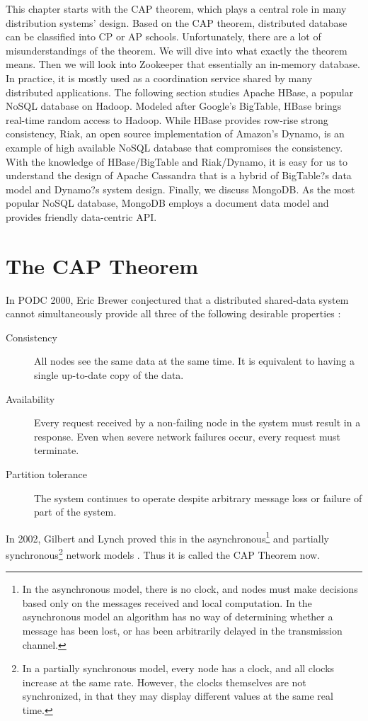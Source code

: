 \documentclass[12pt]{book}
\begin{document}
This chapter starts with the CAP theorem, which plays a central role in many distribution systems' design. Based on the CAP theorem, distributed database can be classified into CP or AP schools. Unfortunately, there are a lot of misunderstandings of the theorem. We will dive into what exactly the theorem means. Then we will look into Zookeeper that essentially an in-memory database. In practice, it is mostly used as a coordination service shared by many distributed applications. The following section studies Apache HBase, a popular NoSQL database on Hadoop. Modeled after Google's BigTable, HBase brings real-time random access to Hadoop. While HBase provides row-rise strong consistency, Riak, an open source implementation of Amazon's Dynamo, is an example of high available NoSQL database that compromises the consistency. With the knowledge of HBase/BigTable and Riak/Dynamo, it is easy for us to understand the design of Apache Cassandra that is a hybrid of BigTable?s data model and Dynamo?s system design. Finally, we discuss MongoDB. As the most popular NoSQL database, MongoDB employs a document data model and provides friendly data-centric API.

\section[The CAP Theorem]
{The CAP Theorem} \label{sec:cap}
In PODC 2000, Eric Brewer conjectured that a distributed shared-data system cannot simultaneously provide all three of the following desirable properties \cite{Brewer:2000:TRD}:
\begin{description}
\item[Consistency] All nodes see the same data at the same time. It is equivalent to having a single up-to-date copy of the data.
\item[Availability] Every request received by a non-failing node in the system must result in a response. Even when severe network failures occur, every request must terminate.
\item[Partition tolerance] The system continues to operate despite arbitrary message loss or failure of part of the system.
\end{description}
In 2002, Gilbert and Lynch proved this in the asynchronous\footnote{In the asynchronous model, there is no clock, and nodes must make decisions based only on the messages received and local computation. In the asynchronous model an algorithm has no way of determining whether a message has been lost, or has been arbitrarily delayed in the transmission channel.} and partially synchronous\footnote{In a partially synchronous model, every node has a clock, and all clocks increase at the same rate. However, the clocks themselves are not synchronized, in that they may display different values at the same real time.} network models \cite{Gilbert:2002:BCF}. Thus it is called the CAP Theorem now.
\end{document}

